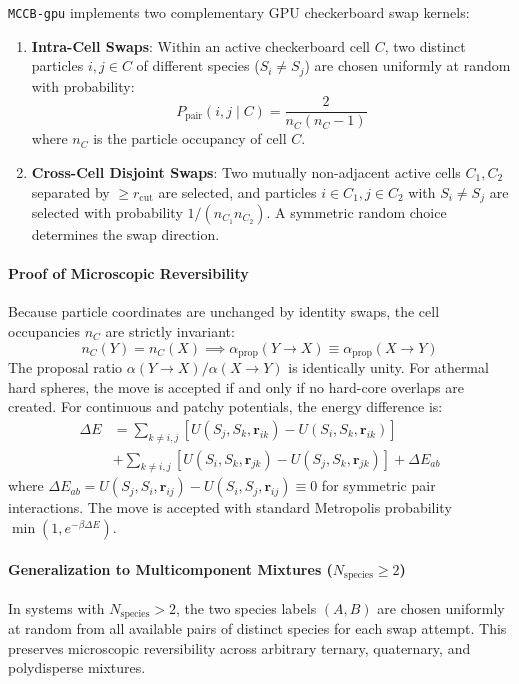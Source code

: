 \documentclass[final,5p,times,twocolumn]{elsarticle}
\begin{document}
\texttt{MCCB-gpu} implements two complementary GPU checkerboard swap
kernels: 
\begin{enumerate}
    \item \textbf{Intra-Cell Swaps}: Within an active checkerboard
      cell $C$, two distinct particles $i, j \in C$ of different
      species ($S_i \neq S_j$) are chosen uniformly at random with
      probability: 
    \begin{equation}
        P_{\text{pair}}(i, j \mid C) = \frac{2}{n_C(n_C - 1)}
    \end{equation}
    where $n_C$ is the particle occupancy of cell $C$.
    \item \textbf{Cross-Cell Disjoint Swaps}: Two mutually
      non-adjacent active cells $C_1, C_2$ separated by $\ge
      r_{\text{cut}}$ are selected, and particles $i \in C_1, j \in
      C_2$ with $S_i \neq S_j$ are selected with probability $1 /
      (n_{C_1} n_{C_2})$. A symmetric random choice determines the
      swap direction. 
\end{enumerate}

\paragraph{Proof of Microscopic Reversibility}
Because particle coordinates are unchanged by identity swaps, the cell
occupancies $n_C$ are strictly invariant: 
\begin{equation}
    n_C(Y) = n_C(X) \implies \alpha_{\text{prop}}(Y \to X) \equiv \alpha_{\text{prop}}(X \to Y)
\end{equation}
The proposal ratio $\alpha(Y \to X)/\alpha(X \to Y)$ is identically
unity. For athermal hard spheres, the move is accepted if and only if
no hard-core overlaps are created. For continuous and patchy
potentials, the energy difference is: 
\begin{align}
    \Delta E &= \sum_{k \neq i, j} \left[ U(S_j, S_k, \mathbf{r}_{ik}) - U(S_i, S_k, \mathbf{r}_{ik}) \right] \nonumber \\
             &+ \sum_{k \neq i, j} \left[ U(S_i, S_k, \mathbf{r}_{jk}) - U(S_j, S_k, \mathbf{r}_{jk}) \right] + \Delta E_{ab}
\end{align}
where $\Delta E_{ab} = U(S_j, S_i, \mathbf{r}_{ij}) - U(S_i, S_j,
\mathbf{r}_{ij}) \equiv 0$ for symmetric pair interactions. The move
is accepted with standard Metropolis probability $\min(1, e^{-\beta
  \Delta E})$. 

\paragraph{Generalization to Multicomponent Mixtures ($N_{\text{species}} \ge 2$)}
In systems with $N_{\text{species}} > 2$, the two species labels $(A,
B)$ are chosen uniformly at random from all available pairs of
distinct species for each swap attempt. This preserves microscopic
reversibility across arbitrary ternary, quaternary, and polydisperse
mixtures. 
\end{document}
